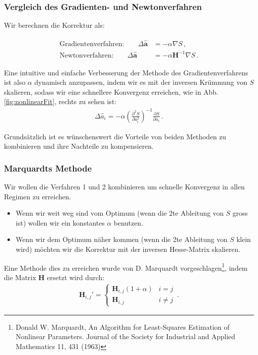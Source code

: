\subsubsection{Vergleich des Gradienten- und Newtonverfahren}
\label{subsubsec:vl9-3}

Wir berechnen die Korrektur als:

\begin{align}
\begin{split}
\text{Gradientenverfahren:}\quad \quad \Delta \boldsymbol{\hat{a}} &= -\alpha \nabla S\,,\\
\text{Newtonverfahren:}\quad \quad \Delta \boldsymbol{\hat{a}} &= -\alpha \boldsymbol{H}^{-1} \nabla S\,.
\label{eq:vl9-14}
\end{split}
\end{align}

Eine intuitive und einfache Verbesserung der Methode des Gradientenverfahrens ist also $\alpha$ dynamisch anzupassen, indem wir es mit der inversen Kr\"ummung von $S$ skalieren, sodass wir eine schnellere Konvergenz erreichen, wie in Abb. \ref{fig:nonlinearFit}, rechts zu sehen ist:
\begin{align}
\Delta \hat{a}_i = -\alpha \left( \frac{ \partial^2 S }{ \partial a_i^2 } \right)^{-1} \frac{ \partial S }{ \partial a_i }\,.
\label{eq:vl9-15}
\end{align}

Grunds\"atzlich ist es w\"unschenswert die Vorteile von beiden Methoden zu kombinieren und ihre Nachteile zu kompensieren.


\subsubsection{Marquardts Methode}
\label{subsubsec:vl9-4}

Wir wollen die Verfahren 1 und 2 kombinieren um schnelle Konvergenz in allen Regimen zu erreichen.
\begin{itemize}
    \setlength\itemsep{0em}
        \item Wenn wir weit weg sind vom Optimum (wenn die 2te Ableitung von $S$ gross ist) wollen wir ein konstantes $\alpha$ benutzen.
        \item Wenn wir dem Optimum n\"aher kommen (wenn die 2te Ableitung von $S$ klein wird) m\"ochten wir die Korrektur mit der inversen Hesse-Matrix skalieren.
\end{itemize}

Eine Methode dies zu erreichen wurde von D. Marquardt vorgeschlagen\footnote{Donald W. Marquardt, An Algorithm for Least-Squares Estimation of Nonlinear Parameters. Journal of the Society for Industrial and Applied Mathematics 11, 431 (1963)}, indem die Matrix $\boldsymbol{H}$ ersetzt wird durch:
\begin{align}
\boldsymbol{H}_{i,j}' =
    \begin{cases}
        \boldsymbol{H}_{i,j} (1 + \alpha) &i = j \\
        \boldsymbol{H}_{i,j} &i \neq j 
    \end{cases}\,.       
\label{eq:vl9-16}
\end{align}

